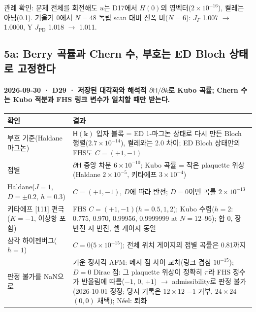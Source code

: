   \par\medskip
  관례 확인: 문제 전체를 회전해도 $u$는 D17에서 $H(0)$의 영벡터($2\times10^{-16}$), 켤레는 아님(0.1). 기울기 0에서 $N=48$ 독립 scan 대비 진폭 비($N=6$): $J_\Gamma$ 1.007 $\to$ 1.0000, Y $J_{\mathrm{PD}}$ 1.018 $\to$ 1.011.
  \par\smallskip
\endgroup


\subsection{5a: Berry 곡률과 Chern 수, 부호는 ED Bloch 상태로 고정한다}\label{stage5a}
\begingroup%
  \framesubtitle{2026-09-30 · D29 · 저장된 대각화와 해석적 $\partial\mathsf H/\partial k$로 Kubo 곡률; Chern 수는 Kubo 적분과 FHS 링크 변수가 일치할 때만 받는다.}
  \footnotesize\renewcommand{\arraystretch}{1.06}
  \begin{tabularx}{\textwidth}{@{}P{3.4cm}Y@{}}
    \toprule
    확인 & 결과 \\
    \midrule
    부호 기준(Haldane 마그논) & $\mathsf H(\mathbf k)$ 입자 블록 = ED 1-마그논 상태로 다시 만든 Bloch 행렬($2.7\times10^{-14}$), 켤레와는 2.0 차이; ED Bloch 상태만의 FHS도 $C=(+1,-1)$ \\
    점별 & $\partial\mathsf H$ 중앙 차분 $6\times10^{-10}$; Kubo 곡률 = 작은 plaquette 위상(Haldane $2\times10^{-5}$, 키타에프 $3\times10^{-4}$) \\
    Haldane($J=1$, $D=\pm0.2$, $h=0.3$) & $C=(+1,-1)$, $D$에 따라 반전; $D=0$이면 곡률 $2\times10^{-13}$ \\
    키타에프 [111] 편극($K=-1$, 이상항 포함) & FHS $C=(+1,-1)$($h=0.5,1,2$); Kubo 수렴($h=2$: 0.775, 0.970, 0.99956, 0.9999999 at $N=12$--96); 합 0, 장 반전 시 반전, 셀 게이지 동일 \\
    삼각 하이젠버그($h=1$) & $C=0$($5\times10^{-15}$); 전체 위치 게이지의 점별 곡률은 0.81까지 \\
    판정 불가를 NaN으로 & 기운 정사각 AFM: 메시 점 사이 교차(링크 겹침 $10^{-15}$); $D=0$ Dirac 점: 그 plaquette 위상이 정확히 $\pi$라 FHS 정수가 반올림에 따름($-1$, 0, $+1$) $\to$ admissibility로 판정 불가(2026-10-01 정정; 당시 기록은 $12\times12$ $-1$ 거부, $24\times24$ $(0,0)$ 채택); Néel: 퇴화 \\
    \bottomrule
  \end{tabularx}
  \par\smallskip
\endgroup


